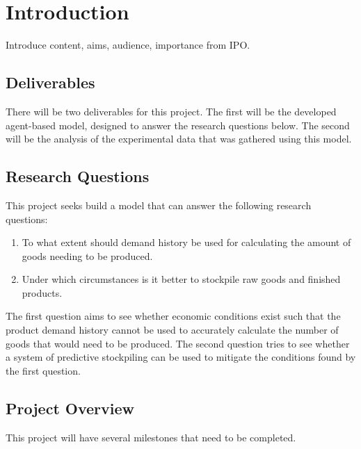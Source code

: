 \section{Introduction}

Introduce content, aims, audience, importance from IPO\@.

\subsection{Deliverables}

There will be two deliverables for this project.
The first will be the developed agent-based model, designed to answer the research questions below.
The second will be the analysis of the experimental data that was gathered using this model.

\subsection{Research Questions}\label{sec:research_questions}

This project seeks build a model that can answer the following research questions:

\begin{enumerate}
    \item To what extent should demand history be used for calculating the amount of goods needing to be produced.
    \item Under which circumstances is it better to stockpile raw goods and finished products.
\end{enumerate}

The first question aims to see whether economic conditions exist such that the product demand history cannot be used to accurately calculate the number of goods that would need to be produced.
The second question tries to see whether a system of predictive stockpiling can be used to mitigate the conditions found by the first question.

\subsection{Project Overview}

This project will have several milestones that need to be completed.

